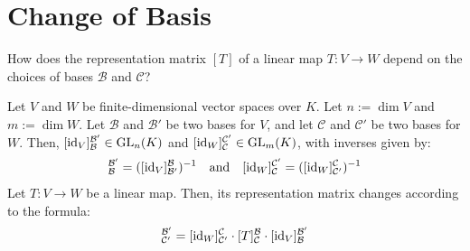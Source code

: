 \renewcommand{\thetheorem}{17.b.\arabic{theorem}}
\setcounter{theorem}{0}


\section{Change of Basis}
\label{sec:change_of_basis}

\begin{question}
How does the representation matrix $[T]$ of a linear map $T: V \to W$ depend on the choices of bases $\mathcal{B}$ and $\mathcal{C}$?
\end{question}

\begin{corollary}
\label{cor:change_of_basis_formula}
Let $V$ and $W$ be finite-di\-men\-sional vector spaces over $K$. Let $n := \dim V$ and $m := \dim W$. Let $\mathcal{B}$ and $\mathcal{B}'$ be two bases for $V$, and let $\mathcal{C}$ and $\mathcal{C}'$ be two bases for $W$. Then, $[\operatorname{id}_V]_{\mathcal{B}}^{\mathcal{B}'} \in \operatorname{GL}_n(K)$ and $[\operatorname{id}_W]_{\mathcal{C}}^{\mathcal{C}'} \in \operatorname{GL}_m(K)$, with inverses given by:
\begin{equation*}
    [\id_V]_{\mathcal{B}}^{\mathcal{B}'} = ([\id_V]_{\mathcal{B}'}^{\mathcal{B}})^{-1} \quad \text{and} \quad [\id_W]_{\mathcal{C}}^{\mathcal{C}'} = ([\id_W]_{\mathcal{C}'}^{\mathcal{C}})^{-1}
\end{equation*}
Let $T: V \to W$ be a linear map. Then, its representation matrix changes according to the formula:
\begin{equation*}
    [T]_{\mathcal{C}'}^{\mathcal{B}'} = [\id_W]_{\mathcal{C}'}^{\mathcal{C}} \cdot [T]_{\mathcal{C}}^{\mathcal{B}} \cdot [\id_V]_{\mathcal{B}}^{\mathcal{B}'}
\end{equation*}
\end{corollary}

